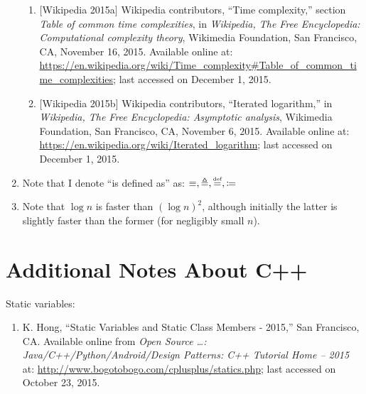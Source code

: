 \begin{enumerate}
\begin{enumerate}
	\item $[$Wikipedia 2015a$]$ Wikipedia contributors, ``Time complexity,'' section {\it Table of common time complexities}, in {\it Wikipedia, The Free Encyclopedia: Computational complexity theory}, Wikimedia Foundation, San Francisco, CA, November 16, 2015. Available online at: \url{https://en.wikipedia.org/wiki/Time_complexity#Table_of_common_time_complexities}; last accessed on December 1, 2015.
	\item $[$Wikipedia 2015b$]$ Wikipedia contributors, ``Iterated logarithm,'' in {\it Wikipedia, The Free Encyclopedia: Asymptotic analysis}, Wikimedia Foundation, San Francisco, CA, November 6, 2015. Available online at: \url{https://en.wikipedia.org/wiki/Iterated_logarithm}; last accessed on December 1, 2015.
	\end{enumerate}
\item Note that I denote ``is defined as'' as: $\equiv, \triangleq, \stackrel{\text{\tiny def}}{=}, \coloneqq$
\item Note that $\log n$ is faster than $(\log n)^{2}$, although initially the latter is slightly faster than the former (for negligibly small $n$).
\end{enumerate}





\section{Additional Notes About C++}
\label{sec:AdditionalNotesAboutCpp}


Static variables: \vspace{-0.3cm}
\begin{enumerate} \itemsep -4pt
\item K. Hong, ``Static Variables and Static Class Members - 2015,'' San Francisco, CA. Available online from {\it Open Source \dots: Java/C++/Python/Android/Design Patterns: C++ Tutorial Home -- 2015} at: \url{http://www.bogotobogo.com/cplusplus/statics.php}; last accessed on October 23, 2015.
\end{enumerate}




